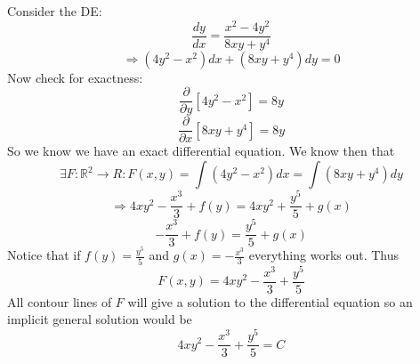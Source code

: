 \documentclass[12pt]{article}
\begin{document}
\noindent 
Consider the DE: 
\[ 
    \frac{dy}{dx} = \frac{x^2 - 4y^2}{8xy + y^4}
\]
\[ 
    \Rightarrow (4y^2 - x^2)dx + (8xy + y^4)dy = 0
\]
Now check for exactness: 
\[ 
    \frac{\partial }{\partial y}\left[ 4y^2 - x ^2\right] = 8y 
\]
\[ 
    \frac{\partial}{\partial x}\left[ 8xy + y^4\right] = 8y
\]
So we know we have an exact differential equation.
We know then that  
\[
    \exists F:\mathbb R^2 \to R : F(x,y) = \displaystyle\int (4y^2 - x^2)dx = 
    \displaystyle\int (8xy+y^4)dy
\]
\[ 
    \Rightarrow 4xy^2 - \frac{x^3}{3} + f(y) = 4xy^2 + \frac{y^5}{5}+g(x)
\]
\[ 
    -\frac{x^3}{3} + f(y) = \frac{y^5}{5} + g(x)
\]
Notice that if \(f(y) = \frac{y^5}{5}\) and \(g(x) = -\frac{x^3}{3}\) everything works out. 
Thus 
\[
    F(x,y) = 4xy^2 - \frac{x^3}{3} + \frac{y^5}{5}
\]
All contour lines of \(F\) will give a solution to the differential equation so 
an implicit general solution would be 
\[ 
    4xy^2 - \frac{x^3}{3}+\frac{y^5}{5} = C
\]
\end{document}
